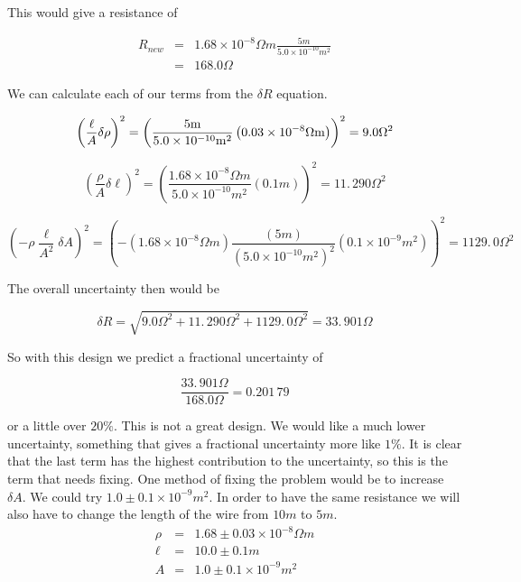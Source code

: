 This would give a resistance of 

\begin{eqnarray*}
	R_{new} &=&1.68\times 10^{-8}\unit{\Omega}\unit{m}\frac{5\unit{m}}{5.0\times 10^{-10}\unit{m}^{2}} \\
	&=&168.0\unit{\Omega}
\end{eqnarray*}

We can calculate each of our terms from the $\delta R$ equation. 

\begin{equation*}
	\left( \frac{\ell }{A}\delta \rho \right) ^{2}=\left( \frac{5\unit{m}}{%
		5.0\times 10^{-10}\unit{m}^{2}}\left( 0.03\times 10^{-8}\unit{\Omega	}\unit{m}\right) \right) ^{2}=9.0\unit{\Omega}^{2}
\end{equation*}

\begin{equation*}
	\left( \frac{\rho }{A}\delta \ell \right) ^{2}=\left( \frac{1.68\times
		10^{-8}\unit{\Omega}\unit{m}}{5.0\times 10^{-10}\unit{m}^{2}}\left( 0.1\unit{m}\right) \right) 	^{2}=11.\,\allowbreak 290\unit{\Omega}^{2}
\end{equation*}

\begin{equation*}
	\left( -\rho \frac{\ell }{A^{2}}\delta A\right) ^{2}=\left( -\left(
	1.68\times 10^{-8}\unit{\Omega}\unit{m}\right) \frac{\left( 5\unit{m}\right) }{\left( 5.0\times 10^{-10} \unit{m}^{2}\right) ^{2}}\left( 0.1\times 10^{-9}\unit{m}^{2}\right) \right)
	^{2}=1129.\,\allowbreak 0\unit{\Omega}^{2}
\end{equation*}

The overall uncertainty then would be

\begin{equation*}
	\delta R=\sqrt{9.0\unit{\Omega}^{2}+11.\,\allowbreak 290\unit{\Omega}^{2}+1129.\,\allowbreak 0\unit{\Omega}^{2}}=33.\,\allowbreak 901\unit{\Omega}
\end{equation*}

So with this design we predict a fractional uncertainty of 

\begin{equation*}
	\frac{33.\,\allowbreak 901\unit{\Omega}}{168.0\unit{\Omega}}=0.201\,79
\end{equation*}

or a little over $20\%.$ This is not a great design. We would like a much
lower uncertainty, something that gives a fractional uncertainty more like $%
1\%.$ It is clear that the last term has the highest contribution to the
uncertainty, so this is the term that needs fixing. One method of fixing the
problem would be to increase $\delta A.$ We could try $1.0\pm 0.1\times
10^{-9}\unit{m}^{2}.$ In order to have the same resistance we will also have
to change the length of the wire from $10\unit{m}$ to $5\unit{m}$. 
\begin{eqnarray*}
	\rho &=&1.68\pm 0.03\times 10^{-8}\unit{\Omega}\unit{m} \\
	\ell &=&10.0\pm 0.1\unit{m} \\
	A &=&1.0\pm 0.1\times 10^{-9}\unit{m}^{2}
\end{eqnarray*}

